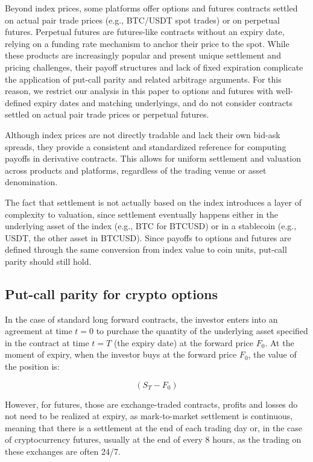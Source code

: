 \documentclass[12pt]{article}
\begin{document}
Beyond index prices, some platforms offer options and futures contracts settled on actual pair trade prices (e.g., BTC/USDT spot trades) or on perpetual futures. Perpetual futures are futures-like contracts without an expiry date, relying on a funding rate mechanism to anchor their price to the spot. While these products are increasingly popular and present unique settlement and pricing challenges, their payoff structures and lack of fixed expiration complicate the application of put-call parity and related arbitrage arguments. For this reason, we restrict our analysis in this paper to options and futures with well-defined expiry dates and matching underlyings, and do not consider contracts settled on actual pair trade prices or perpetual futures.

Although index prices are not directly tradable and lack their own bid-ask spreads, they provide a consistent and standardized reference for computing payoffs in derivative contracts. This allows for uniform settlement and valuation across products and platforms, regardless of the trading venue or asset denomination.

The fact that settlement is not actually based on the index introduces a layer of complexity to valuation, since settlement eventually happens either in the underlying asset of the index (e.g., BTC for BTCUSD) or in a stablecoin (e.g., USDT, the other asset in BTCUSD). Since payoffs to options and futures are defined through the same conversion from index value to coin units, put-call parity should still hold.

\subsection{Put-call parity for crypto options}

In the case of standard long forward contracts, the investor enters into an agreement at time $t=0$ to purchase the quantity of the underlying asset specified in the contract at time $t=T$ (the expiry date) at the forward price $F_0$. At the moment of expiry, when the investor buys at the forward price $F_0$, the value of the position is:

    \begin{equation}
    \label{fut}
    (S_T-F_0)
    \end{equation}

However, for futures, those are exchange-traded contracts, profits and losses do not need to be realized at expiry, as mark-to-market settlement is continuous, meaning that there is a settlement at the end of each trading day or, in the case of cryptocurrency futures, usually at the end of every 8 hours, as the trading on these exchanges are often 24/7.
\end{document}
